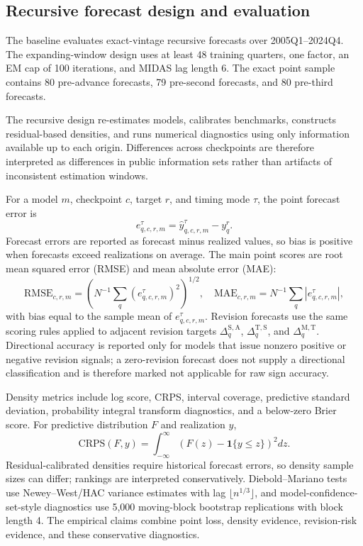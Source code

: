 \documentclass[12pt]{article}
\newcommand{\Arel}{\mathrm{A}}
\newcommand{\Srel}{\mathrm{S}}
\newcommand{\Trel}{\mathrm{T}}
\newcommand{\Mrel}{\mathrm{M}}
\newcommand{\dSA}{\Delta^{\Srel,\Arel}}
\newcommand{\dTS}{\Delta^{\Trel,\Srel}}
\newcommand{\dMT}{\Delta^{\Mrel,\Trel}}
\begin{document}
\subsection{Recursive forecast design and evaluation}
\label{sec:evaluation}

The baseline evaluates exact-vintage recursive forecasts over 2005Q1--2024Q4. The expanding-window design uses at least 48 training quarters, one factor, an EM cap of 100 iterations, and MIDAS lag length 6. The exact point sample contains 80 pre-advance forecasts, 79 pre-second forecasts, and 80 pre-third forecasts.

The recursive design re-estimates models, calibrates benchmarks, constructs residual-based densities, and runs numerical diagnostics using only information available up to each origin. Differences across checkpoints are therefore interpreted as differences in public information sets rather than artifacts of inconsistent estimation windows.

For a model $m$, checkpoint $c$, target $r$, and timing mode $\tau$, the point forecast error is
\[
e_{q,c,r,m}^{\tau}=\widehat y_{q,c,r,m}^{\tau}-y_q^r.
\]
Forecast errors are reported as forecast minus realized values, so bias is positive when forecasts exceed realizations on average. The main point scores are root mean squared error (RMSE) and mean absolute error (MAE):
\[
\mathrm{RMSE}_{c,r,m}=\left(N^{-1}\sum_q (e_{q,c,r,m}^{\tau})^2\right)^{1/2},\quad
\mathrm{MAE}_{c,r,m}=N^{-1}\sum_q |e_{q,c,r,m}^{\tau}|,
\]
with bias equal to the sample mean of $e_{q,c,r,m}^{\tau}$. Revision forecasts use the same scoring rules applied to adjacent revision targets $\dSA_q$, $\dTS_q$, and $\dMT_q$. Directional accuracy is reported only for models that issue nonzero positive or negative revision signals; a zero-revision forecast does not supply a directional classification and is therefore marked not applicable for raw sign accuracy.

Density metrics include log score, CRPS, interval coverage, predictive standard deviation, probability integral transform diagnostics, and a below-zero Brier score. For predictive distribution $F$ and realization $y$,
\[
\mathrm{CRPS}(F,y)=\int_{-\infty}^{\infty}\left(F(z)-\mathbf 1\{y\leq z\}\right)^2dz.
\]
Residual-calibrated densities require historical forecast errors, so density sample sizes can differ; rankings are interpreted conservatively. Diebold--Mariano tests use Newey--West/HAC variance estimates with lag $\lfloor n^{1/3}\rfloor$, and model-confidence-set-style diagnostics use 5,000 moving-block bootstrap replications with block length 4. The empirical claims combine point loss, density evidence, revision-risk evidence, and these conservative diagnostics.
\end{document}
